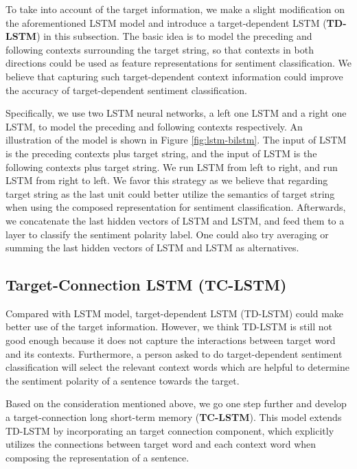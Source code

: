 \documentclass[11pt]{article}
\begin{document}
To take into account of the target information, we make a slight modification on the aforementioned LSTM model and introduce a target-dependent LSTM (\textbf{TD-LSTM}) in this subsection.
The basic idea is to model the preceding and following contexts surrounding the target string, so that contexts in both directions could be used as feature representations for sentiment classification. We believe that capturing such target-dependent context information could improve the accuracy of target-dependent sentiment classification. 

Specifically, we use two LSTM neural networks, a left one LSTM and a right one LSTM, to model the preceding and following contexts respectively. An illustration of the model is shown in Figure \ref{fig:lstm-bilstm}.
The input of LSTM is the preceding contexts plus target string, and the input of LSTM is the following contexts plus target 
string.
We run LSTM from left to right, and run LSTM from right to left.
We favor this strategy as we believe that regarding target string as the last unit could better utilize the semantics of target string when using the composed representation for sentiment classification.
Afterwards, we concatenate the last hidden vectors of LSTM and LSTM, and feed them to a  layer to classify the sentiment polarity label.
One could also try averaging or summing the last hidden vectors of LSTM and LSTM as alternatives.

\subsection{Target-Connection LSTM (TC-LSTM)}
Compared with LSTM model, target-dependent LSTM (TD-LSTM) could make better use of the target information.
However, we think TD-LSTM is still not good enough because it does not capture the interactions between target word and its contexts.
Furthermore, a person asked to do target-dependent sentiment classification will select the relevant context words which are helpful to determine the sentiment polarity of a sentence towards the target. 

Based on the consideration mentioned above, we go one step further and develop a target-connection long short-term memory (\textbf{TC-LSTM}). 
This model extends TD-LSTM by incorporating an target connection component, which explicitly utilizes the connections between target word and each context word when composing the representation of a sentence.
\end{document}
